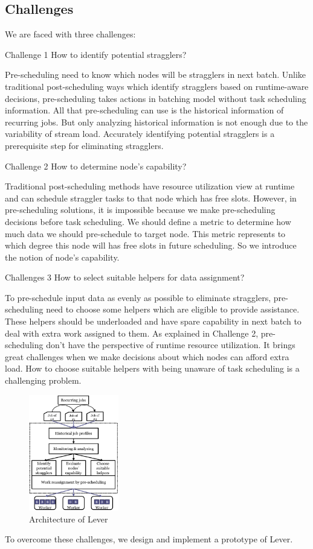 \documentclass[10pt,conference,compsocconf,letterpaper]{IEEEtran}
\begin{document}
\subsection{Challenges}

  We are faced with three challenges:

  Challenge 1 How to identify potential stragglers?

  Pre-scheduling need to know which nodes will be stragglers in next batch. Unlike traditional post-scheduling ways which identify stragglers based on runtime-aware decisions, pre-scheduling takes actions in batching model without task scheduling information. All that pre-scheduling can use is the historical information of recurring jobs. But only analyzing historical information is not enough due to the variability of stream load. Accurately identifying potential stragglers is a prerequisite step for eliminating stragglers.

  Challenge 2 How to determine node's capability?

  Traditional post-scheduling methods have resource utilization view at runtime and can schedule straggler tasks to that node which has free slots. However, in pre-scheduling solutions, it is impossible because we make pre-scheduling decisions before task scheduling. We should define a metric to determine how much data we should pre-schedule to target node. This metric represents to which degree this node will has free slots in future scheduling. So we introduce the notion of node's capability.

  Challenges 3 How to select suitable helpers for data assignment?

  To pre-schedule input data as evenly as possible to eliminate stragglers, pre-scheduling need to choose some helpers which are eligible to provide assistance. These helpers should be underloaded and have spare capability in next batch to deal with extra work assigned to them. As explained in Challenge 2, pre-scheduling don't have the perspective of runtime resource utilization. It brings great challenges when we make decisions about which nodes can afford extra load. How to choose suitable helpers with being unaware of task scheduling is a challenging problem.

  \begin{figure}[htbp]
    \centering
    \includegraphics[width=0.35\textwidth]{FigureArchitecture}
    \caption{Architecture of Lever}
    \label{Fig. 4:}
  \end{figure}
  To overcome these challenges, we design and implement a prototype of Lever.
\end{document}
